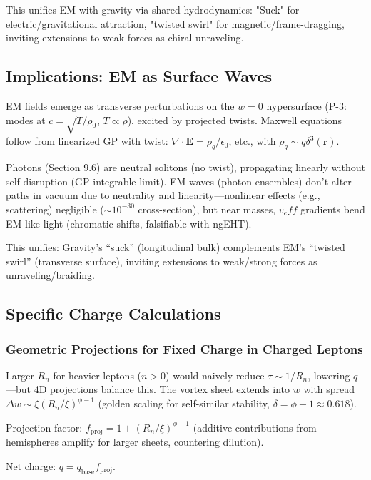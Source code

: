 \documentclass{article}
\begin{document}
This unifies EM with gravity via shared hydrodynamics: "Suck" for electric/gravitational attraction, "twisted swirl" for magnetic/frame-dragging, inviting extensions to weak forces as chiral unraveling.

\subsection{Implications: EM as Surface Waves}

EM fields emerge as transverse perturbations on the $w=0$ hypersurface (P-3: modes at $c = \sqrt{T / \rho_0}$, $T \propto \rho$), excited by projected twists. Maxwell equations follow from linearized GP with twist: $\nabla \cdot \mathbf{E} = \rho_q / \epsilon_0$, etc., with $\rho_q \sim q \delta^3(\mathbf{r})$.

Photons (Section 9.6) are neutral solitons (no twist), propagating linearly without self-disruption (GP integrable limit). EM waves (photon ensembles) don't alter paths in vacuum due to neutrality and linearity---nonlinear effects (e.g., scattering) negligible ($\sim 10^{-30}$ cross-section), but near masses, $v_eff$ gradients bend EM like light (chromatic shifts, falsifiable with ngEHT).

This unifies: Gravity's ``suck'' (longitudinal bulk) complements EM's ``twisted swirl'' (transverse surface), inviting extensions to weak/strong forces as unraveling/braiding.

\subsection{Specific Charge Calculations}

\subsubsection{Geometric Projections for Fixed Charge in Charged Leptons}

Larger $R_n$ for heavier leptons ($n>0$) would naively reduce $\tau \sim 1/R_n$, lowering $q$---but 4D projections balance this. The vortex sheet extends into $w$ with spread $\Delta w \sim \xi (R_n / \xi)^{\phi - 1}$ (golden scaling for self-similar stability, $\delta = \phi - 1 \approx 0.618$).

Projection factor: $f_{\text{proj}} = 1 + (R_n / \xi)^{\phi - 1}$ (additive contributions from hemispheres amplify for larger sheets, countering dilution).

Net charge: $q = q_{\text{base}} f_{\text{proj}}$.
\end{document}
